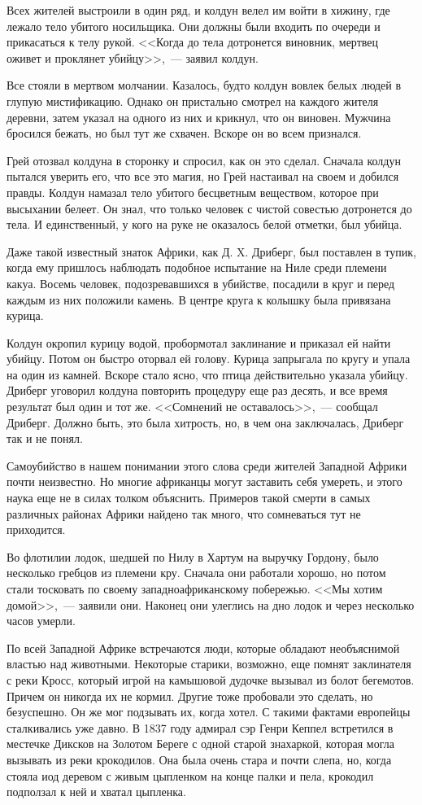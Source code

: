 \documentclass[12pt,a4paper,twoside,openany,svgnames]{memoir}
\begin{document}
Всех жителей выстроили в один ряд, и колдун велел им войти в хижину, где лежало тело убитого носильщика. Они должны были входить по очереди и прикасаться к телу рукой. <<Когда до тела дотронется виновник, мертвец оживет и проклянет убийцу>>,~--- заявил колдун.

Все стояли в мертвом молчании. Казалось, будто колдун вовлек белых людей в глупую мистификацию. Однако он пристально смотрел на каждого жителя деревни, затем указал на одного из них и крикнул, что он виновен. Мужчина бросился бежать, но был тут же схвачен. Вскоре он во всем признался.

Грей отозвал колдуна в сторонку и спросил, как он это сделал. Сначала колдун пытался уверить его, что все это магия, но Грей настаивал на своем и добился правды. Колдун намазал тело убитого бесцветным веществом, которое при высыхании белеет. Он знал, что только человек с чистой совестью дотронется до тела. И единственный, у кого на руке не оказалось белой отметки, был убийца.

Даже такой известный знаток Африки, как Д. X. Дриберг, был поставлен в тупик, когда ему пришлось наблюдать подобное испытание на Ниле среди племени какуа. Восемь человек, подозревавшихся в убийстве, посадили в круг и перед каждым из них положили камень. В центре круга к колышку была привязана курица.

Колдун окропил курицу водой, пробормотал заклинание и приказал ей найти убийцу. Потом он быстро оторвал ей голову. Курица запрыгала по кругу и упала на один из камней. Вскоре стало ясно, что птица действительно указала убийцу. Дриберг уговорил колдуна повторить процедуру еще раз десять, и все время результат был один и тот же. <<Сомнений не оставалось>>,~--- сообщал Дриберг. Должно быть, это была хитрость, но, в чем она заключалась, Дриберг так и не понял.

Самоубийство в нашем понимании этого слова среди жителей Западной Африки почти неизвестно. Но многие африканцы могут заставить себя умереть, и этого наука еще не в силах толком объяснить. Примеров такой смерти в самых различных районах Африки найдено так много, что сомневаться тут не приходится.

Во флотилии лодок, шедшей по Нилу в Хартум на выручку Гордону, было несколько гребцов из племени кру. Сначала они работали хорошо, но потом стали тосковать по своему западноафриканскому побережью. <<Мы хотим домой>>,~--- заявили они. Наконец они улеглись на дно лодок и через несколько часов умерли.

По всей Западной Африке встречаются люди, которые обладают необъяснимой властью над животными. Некоторые старики, возможно, еще помнят заклинателя с реки Кросс, который игрой на камышовой дудочке вызывал из болот бегемотов. Причем он никогда их не кормил. Другие тоже пробовали это сделать, но безуспешно. Он же мог подзывать их, когда хотел. С такими фактами европейцы сталкивались уже давно. В 1837 году адмирал сэр Генри Кеппел встретился в местечке Диксков на Золотом Береге с одной старой знахаркой, которая могла вызывать из реки крокодилов. Она была очень стара и почти слепа, но, когда стояла иод деревом с живым цыпленком на конце палки и пела, крокодил подползал к ней и хватал цыпленка.
\end{document}
